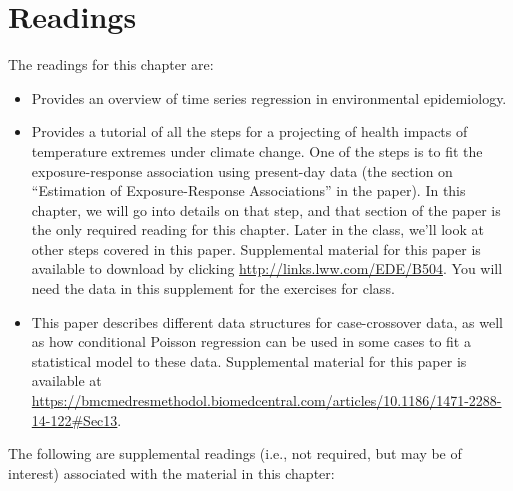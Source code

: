 \documentclass[
]{book}
\providecommand{\tightlist}{%
  \setlength{\itemsep}{0pt}\setlength{\parskip}{0pt}}
\begin{document}
\section{Readings}\label{readings-1}

The readings for this chapter are:

\begin{itemize}
\tightlist
\item
  \citet{bhaskaran2013time} Provides an overview of time series regression
  in environmental epidemiology.
\item
  \citet{vicedo2019hands} Provides a tutorial of all the steps for a
  projecting of health impacts of temperature extremes under climate change.
  One of the steps is to fit the exposure-response association using present-day data
  (the section on ``Estimation of Exposure-Response Associations'' in the paper).
  In this chapter, we will go into details on that step, and that section of the paper
  is the only required reading for this chapter. Later in the class, we'll
  look at other steps covered in this paper. Supplemental material for this paper is
  available to download by
  clicking \url{http://links.lww.com/EDE/B504}. You will need the data in this supplement
  for the exercises for class.
\item
  \citet{armstrong2014conditional} This paper describes different data structures for
  case-crossover data, as well as how conditional Poisson regression can be used
  in some cases to fit a statistical model to these data.
  Supplemental material for this paper is available at
  \url{https://bmcmedresmethodol.biomedcentral.com/articles/10.1186/1471-2288-14-122\#Sec13}.
\end{itemize}

The following are supplemental readings (i.e., not required, but may be of
interest) associated with the material in this chapter:
\end{document}
